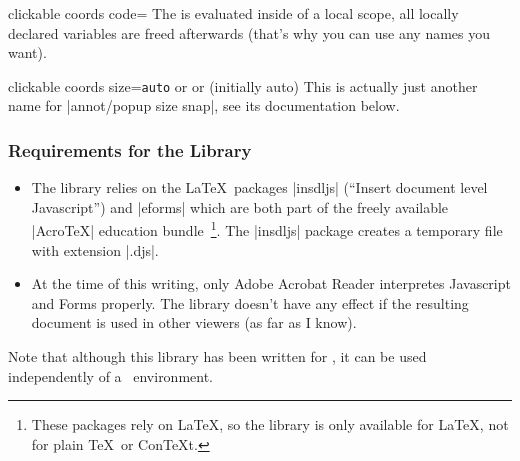 \begin{pgfplotskey}{clickable coords code=}
	The  is evaluated inside of a local scope, all locally declared variables are freed afterwards (that's why you can use any names you want).
\end{pgfplotskey}

\begin{pgfplotskey}{clickable coords size=\texttt{auto} or  or  (initially auto)}
	This is actually just another name for |annot/popup size snap|, see its documentation below.
\end{pgfplotskey}

\subsubsection{Requirements for the Library}
	\begin{itemize}
		\item The library relies on the \LaTeX\ packages |insdljs| (``Insert document level Javascript'') and |eforms| which are both part of the freely available |AcroTeX| education bundle~\cite{acrotex}\footnote{These packages rely on \LaTeX, so the library is only available for \LaTeX, not for plain \TeX\ or Con\TeX t.}. The |insdljs| package creates a temporary file with extension |.djs|.
		
		\item At the time of this writing, only Adobe Acrobat Reader interpretes Javascript and Forms properly. The library doesn't have any effect if the resulting document is used in other viewers (as far as I know).

	\end{itemize}
	Note that although this library has been written for \PGFPlots, it can be used independently of a \PGFPlots\ environment.


